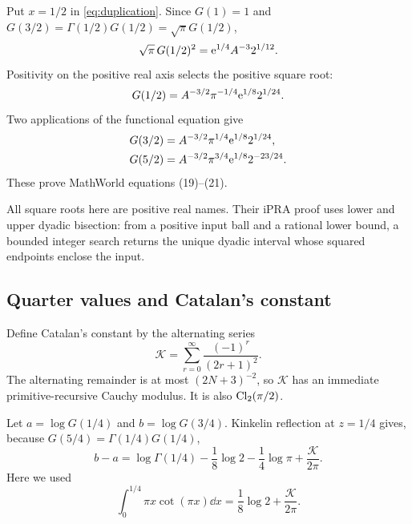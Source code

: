 Put \(x=1/2\) in \cref{eq:duplication}.  Since \(G(1)=1\) and
\(G(3/2)=\Gamma(1/2)G(1/2)=\sqrt\pi G(1/2)\),
\[
 \sqrt\pi\,G(1/2)^2=\mathrm e^{1/4}A^{-3}2^{1/12}.
\]
Positivity on the positive real axis selects the positive square root:
\begin{equation}\label{eq:Ghalf}
 G(1/2)=A^{-3/2}\pi^{-1/4}\mathrm e^{1/8}2^{1/24}.
\end{equation}
Two applications of the functional equation give
\begin{align}
 G(3/2)&=A^{-3/2}\pi^{1/4}\mathrm e^{1/8}2^{1/24},
 \label{eq:Gthreehalf}\\
 G(5/2)&=A^{-3/2}\pi^{3/4}\mathrm e^{1/8}2^{-23/24}.
 \label{eq:Gfivehalf}
\end{align}
These prove MathWorld equations (19)--(21).

All square roots here are positive real names.  Their iPRA proof uses lower and
upper dyadic bisection: from a positive input ball and a rational lower bound,
a bounded integer search returns the unique dyadic interval whose squared
endpoints enclose the input.

\subsection{Quarter values and Catalan's constant}

Define Catalan's constant by the alternating series
\begin{equation}\label{eq:Catalan}
 \mathcal K=\sum_{r=0}^{\infty}\frac{(-1)^r}{(2r+1)^2}.
\end{equation}
The alternating remainder is at most \((2N+3)^{-2}\), so \(\mathcal K\) has an
immediate primitive-recursive Cauchy modulus.  It is also
\(\operatorname{Cl}_2(\pi/2)\).

Let
\(a=\log G(1/4)\) and \(b=\log G(3/4)\).  Kinkelin reflection at \(z=1/4\)
gives, because \(G(5/4)=\Gamma(1/4)G(1/4)\),
\begin{equation}\label{eq:quarter-difference}
 b-a=\log\Gamma(1/4)-\frac18\log2-\frac14\log\pi
      +\frac{\mathcal K}{2\pi}.
\end{equation}
Here we used
\[
 \int_0^{1/4}\pi x\cot(\pi x)\dd x
 =\frac18\log2+\frac{\mathcal K}{2\pi}.
\]

